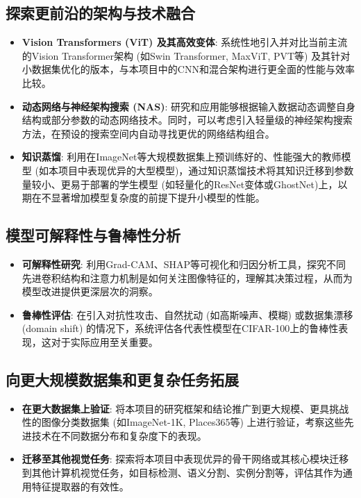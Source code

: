 \documentclass[a4paper]{article}
\begin{document}
\subsection{探索更前沿的架构与技术融合}
\begin{itemize}
    \item \textbf{Vision Transformers (ViT) 及其高效变体}: 系统性地引入并对比当前主流的Vision Transformer架构 (如Swin Transformer, MaxViT, PVT等) 及其针对小数据集优化的版本，与本项目中的CNN和混合架构进行更全面的性能与效率比较。
    \item \textbf{动态网络与神经架构搜索 (NAS)}: 研究和应用能够根据输入数据动态调整自身结构或部分参数的动态网络技术。同时，可以考虑引入轻量级的神经架构搜索方法，在预设的搜索空间内自动寻找更优的网络结构组合。
    \item \textbf{知识蒸馏}: 利用在ImageNet等大规模数据集上预训练好的、性能强大的教师模型 (如本项目中表现优异的大型模型)，通过知识蒸馏技术将其知识迁移到参数量较小、更易于部署的学生模型 (如轻量化的ResNet变体或GhostNet)上，以期在不显著增加模型复杂度的前提下提升小模型的性能。
\end{itemize}

\subsection{模型可解释性与鲁棒性分析}
\begin{itemize}
    \item \textbf{可解释性研究}: 利用Grad-CAM、SHAP等可视化和归因分析工具，探究不同先进卷积结构和注意力机制是如何关注图像特征的，理解其决策过程，从而为模型改进提供更深层次的洞察。
    \item \textbf{鲁棒性评估}: 在引入对抗性攻击、自然扰动 (如高斯噪声、模糊) 或数据集漂移 (domain shift) 的情况下，系统评估各代表性模型在CIFAR-100上的鲁棒性表现，这对于实际应用至关重要。
\end{itemize}

\subsection{向更大规模数据集和更复杂任务拓展}
\begin{itemize}
    \item \textbf{在更大数据集上验证}: 将本项目的研究框架和结论推广到更大规模、更具挑战性的图像分类数据集 (如ImageNet-1K, Places365等) 上进行验证，考察这些先进技术在不同数据分布和复杂度下的表现。
    \item \textbf{迁移至其他视觉任务}: 探索将本项目中表现优异的骨干网络或其核心模块迁移到其他计算机视觉任务，如目标检测、语义分割、实例分割等，评估其作为通用特征提取器的有效性。
\end{itemize}
\end{document}
